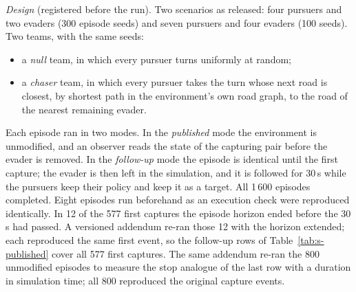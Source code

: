 \documentclass[preprint,12pt]{elsarticle}
\begin{document}
\emph{Design} (registered before the run). Two scenarios as released: four pursuers and two evaders (300 episode
seeds) and seven pursuers and four evaders (100 seeds). Two teams, with the same seeds:
\begin{itemize}
\item a \emph{null} team, in which every pursuer turns uniformly at random;
\item a \emph{chaser} team, in which every pursuer takes the turn whose next road is closest, by shortest path in the
environment's own road graph, to the road of the nearest remaining evader.
\end{itemize}
Each episode ran in two modes. In the \emph{published} mode the environment is unmodified, and an observer reads the
state of the capturing pair before the evader is removed. In the \emph{follow-up} mode the episode is identical until
the first capture; the evader is then left in the simulation, and it is followed for 30\,s while the pursuers keep
their policy and keep it as a target. All 1\,600 episodes completed. Eight episodes run beforehand as an execution
check were reproduced identically. In 12 of the 577 first captures the episode horizon ended before the 30\,s had
passed. A versioned addendum re-ran those 12 with the horizon extended; each reproduced the same first event, so the
follow-up rows of Table~\ref{tab:s-published} cover all 577 first captures. The same addendum re-ran the 800
unmodified episodes to measure the stop analogue of the last row with a duration in simulation time; all 800
reproduced the original capture events.
\end{document}
